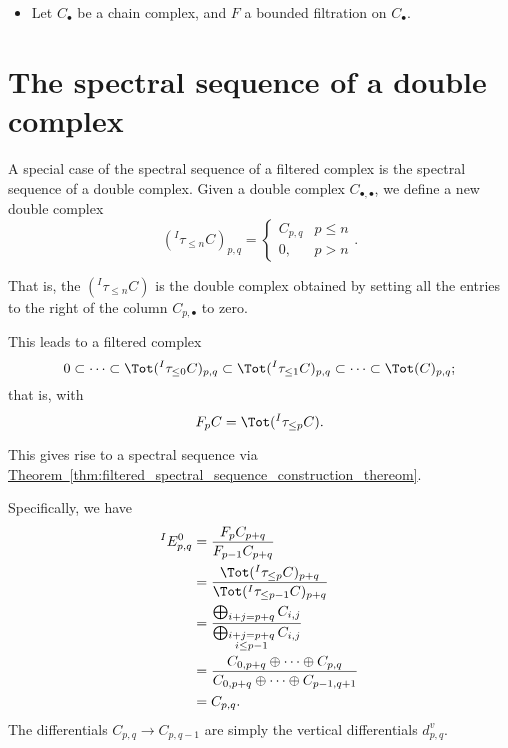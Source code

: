 \documentclass[main.tex]{subfiles}
\begin{document}
\begin{theorem}
  \leavevmode
  \begin{itemize}
    \item Let $C_{\bullet}$ be a chain complex, and $F$ a bounded filtration on $C_{\bullet}$.
  \end{itemize}
\end{theorem}

\section{The spectral sequence of a double complex}
\label{sec:the_spectral_sequence_of_a_double_complex}

A special case of the spectral sequence of a filtered complex is the spectral sequence of a double complex. Given a double complex $C_{\bullet,\bullet}$, we define a new double complex
\begin{equation*}
  \left(^{I}\tau_{\leq n}C\right)_{p,q} =
  \begin{cases}
    C_{p,q} & p \leq n \\
    0, & p > n
  \end{cases}.
\end{equation*}

That is, the $\left(^{I}\tau_{\leq n}C\right)$ is the double complex obtained by setting all the entries to the right of the column $C_{p, \bullet}$ to zero.

This leads to a filtered complex
\begin{equation*}
  0 \subset \cdots \subset \Tot(^{I}\tau_{\leq 0}C)_{p, q} \subset \Tot(^{I}\tau_{\leq 1}C)_{p, q} \subset \cdots \subset \Tot(C)_{p,q};
\end{equation*}
that is, with
\begin{equation*}
  F_{p}C = \Tot(^{I}\tau_{\leq p}C).
\end{equation*}

This gives rise to a spectral sequence via \hyperref[thm:filtered_spectral_sequence_construction_thereom]{Theorem~\ref*{thm:filtered_spectral_sequence_construction_thereom}}.

Specifically, we have
\begin{align*}
  ^{I}E^{0}_{p,q} &= \frac{F_{p}C_{p+q}}{F_{p-1}C_{p+q}} \\
  &= \frac{\Tot(^{I}\tau_{\leq p}C)_{p+q}}{\Tot(^{I}\tau_{\leq p-1}C)_{p+q}} \\
  &= \frac{\bigoplus_{\substack{i+j = p+q}} C_{i,j}}{\bigoplus_{\substack{i + j = p+q \\ i \leq p-1}}C_{i,j}} \\
  &= \frac{C_{0,p+q} \oplus \cdots \oplus C_{p, q}}{C_{0,p+q} \oplus \cdots \oplus C_{p-1, q+1}} \\
  &= C_{p, q}.
\end{align*}
The differentials $C_{p, q} \to C_{p, q-1}$ are simply the vertical differentials $d^{v}_{p,q}$.
\end{document}
